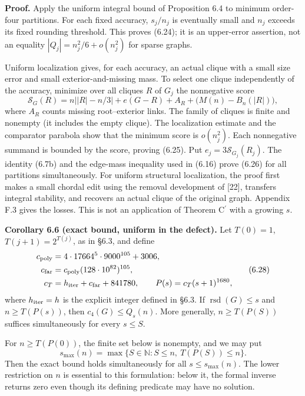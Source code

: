 \documentclass[english,11pt,a4paper]{article}
\newcounter{none}
\begin{document}
\textbf{Proof.} Apply the uniform integral bound of Proposition 6.4 to minimum order-four partitions. For each fixed accuracy, \(s_j/n_j\) is eventually small and \(n_j\) exceeds its fixed rounding threshold. This proves (6.24); it is an upper-error assertion, not an equality \(|Q_j|=n_j^2/6+o(n_j^2)\) for sparse graphs.

Uniform localization gives, for each accuracy, an actual clique with a small size error and small exterior-and-missing mass. To select one clique independently of the accuracy, minimize over all cliques \(R\) of \(G_j\) the nonnegative score \[
\mathcal S_G(R)=n\bigl||R|-n/3\bigr|
 +e(G-R)+A_R+\bigl(M(n)-B_n(|R|)\bigr),
\tag{6.27}
\] where \(A_R\) counts missing root--exterior links. The family of cliques is finite and nonempty (it includes the empty clique). The localization estimate and the comparator parabola show that the minimum score is \(o(n_j^2)\). Each nonnegative summand is bounded by the score, proving (6.25). Put \(e_j=3\mathcal S_{G_j}(R_j)\). The identity (6.7b) and the edge-mass inequality used in (6.16) prove (6.26) for all partitions simultaneously. For uniform structural localization, the proof first makes a small chordal edit using the removal development of {[}22{]}, transfers integral stability, and recovers an actual clique of the original graph. Appendix F.3 gives the losses. This is not an application of Theorem \texorpdfstring{C\ensuremath{^{\prime}}}{C'} with a growing \(s\).


\textbf{Corollary 6.6 (exact bound, uniform in the defect).} Let \(T(0)=1\), \(T(j+1)=2^{T(j)}\), as in §6.3, and define \[
\begin{aligned}
c_{\rm poly}&=4\cdot17664^5\cdot9000^{105}+3006,\\
c_{\rm far}&=c_{\rm poly}(128\cdot10^{82})^{105},\\
c_T&=h_{\rm iter}+c_{\rm far}+841780,\qquad
P(s)=c_T(s+1)^{1680},
\end{aligned}
\tag{6.28}
\] where \(h_{\rm iter}=h\) is the explicit integer defined in §6.3. If \(\operatorname{rsd}(G)\le s\) and \(n\ge T(P(s))\), then \(c_4(G)\le Q_s(n)\). More generally, \(n\ge T(P(S))\) suffices simultaneously for every \(s\le S\).

For \(n\ge T(P(0))\), the finite set below is nonempty, and we may put \[
s_{\max}(n)=\max\{S\in\mathbb N:S\le n,\ T(P(S))\le n\}.
\tag{6.29}
\] Then the exact bound holds simultaneously for all \(s\le s_{\max}(n)\). The lower restriction on \(n\) is essential to this formulation: below it, the formal inverse returns zero even though its defining predicate may have no solution.
\end{document}
